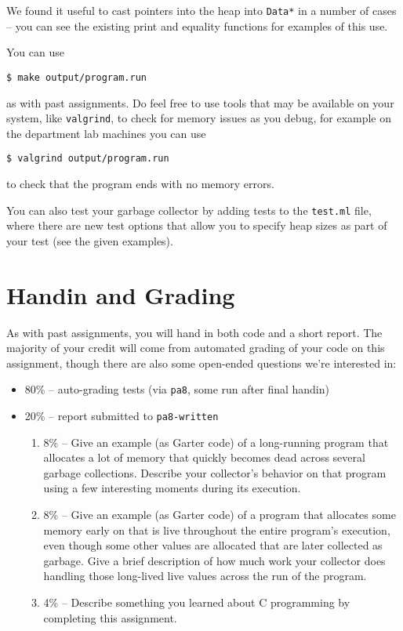 \documentclass[10pt, oneside]{article}
\begin{document}
We found it useful to cast pointers into the heap into {\tt Data*} in a
number of cases -- you can see the existing print and equality functions for
examples of this use.

You can use

\begin{verbatim}
$ make output/program.run
\end{verbatim}

as with past assignments. Do feel free to use tools that may be available on
your system, like {\tt valgrind}, to check for memory issues as you debug,
for example on the department lab machines you can use

\begin{verbatim}
$ valgrind output/program.run
\end{verbatim}

to check that the program ends with no memory errors.

You can also test your garbage collector by adding tests to the {\tt test.ml}
file, where there are new test options that allow you to specify heap sizes
as part of your test (see the given examples).

\section*{Handin and Grading}

As with past assignments, you will hand in both code and a short report. The
majority of your credit will come from automated grading of your code on this
assignment, though there are also some open-ended questions we're interested
in:

\begin{itemize}
\item 80\% -- auto-grading tests (via {\tt pa8}, some run after final handin)
\item 20\% -- report submitted to {\tt pa8-written}
\begin{enumerate}

\item 8\% -- Give an example (as Garter code) of a long-running program that
allocates a lot of memory that quickly becomes dead across several garbage
collections. Describe your collector's behavior on that program using a few
interesting moments during its execution.

\item 8\% -- Give an example (as Garter code) of a program that allocates
some memory early on that is live throughout the entire program's execution,
even though some other values are allocated that are later collected as
garbage. Give a brief description of how much work your collector does
handling those long-lived live values across the run of the program.

\item 4\% -- Describe something you learned about C programming by completing
this assignment.

\end{enumerate}
\end{itemize}
\end{document}
